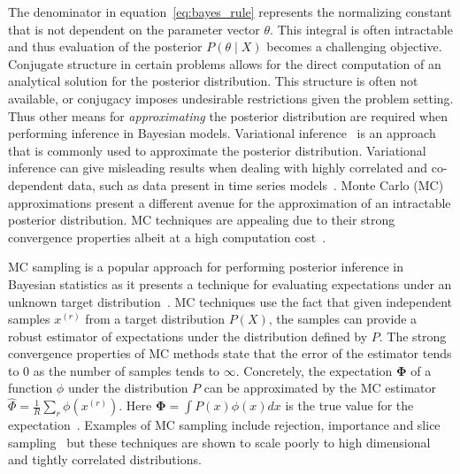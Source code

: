 The denominator in equation~\ref{eq:bayes_rule} represents the normalizing constant that is not dependent on the parameter vector $\theta$. This integral is often intractable and thus evaluation of the posterior $P(\theta \mid X)$ becomes a challenging objective. Conjugate structure in certain problems allows for the direct computation of an analytical solution for the posterior distribution. This structure is often not available, or conjugacy imposes undesirable restrictions given the problem setting. Thus other means for \textit{approximating} the posterior distribution are required when performing inference in Bayesian models. Variational inference~\citep{attias2000variational,saul1996exploiting,saul1996mean,blei2003latent} is an approach that is commonly used to approximate the posterior distribution. Variational inference can give misleading results when dealing with highly correlated and co-dependent data, such as data present in time series models~\citep{turner2011two}. Monte Carlo (MC) approximations present a different avenue for the approximation of an intractable posterior distribution. MC techniques are appealing due to their strong convergence properties albeit at a high computation cost~\citep{mackay1998introduction}.

MC sampling is a popular approach for performing posterior inference in Bayesian statistics as it presents a technique for evaluating expectations under an unknown target distribution~\citep{mackay1998introduction}. MC techniques use the fact that given independent samples $x^{(r)}$ from a target distribution $P(X)$, the samples can provide a robust estimator of expectations under the distribution defined by $P$. The strong convergence properties of MC methods state that the error of the estimator tends to $0$ as the number of samples tends to $\infty$. Concretely, the expectation $\mathbf{\Phi}$ of a function $\phi$ under the distribution $P$ can be approximated by the MC estimator $\hat{\Phi} = \frac{1}{R}\sum\limits_r \phi(x^{(r)})$. Here $\mathbf{\Phi} = \int P(x)\phi(x) dx$ is the true value for the expectation~\citep{mackay1998introduction}. Examples of MC sampling include rejection, importance and slice sampling~\cite{neal2003slice} but these techniques are shown to scale poorly to high dimensional and tightly correlated distributions.

